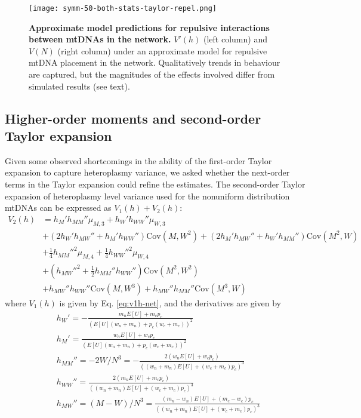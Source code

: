 \documentclass{article}
\begin{document}
\begin{appendices}
{\begin{figure}
\centering
\texttt{[image: symm-50-both-stats-taylor-repel.png]}
\caption{\textbf{Approximate model predictions for repulsive interactions between mtDNAs in the network.} $V'(h)$ (left column) and $V(N)$ (right column) under an approximate model for repulsive mtDNA placement in the network.  Qualitatively trends in behaviour are captured, but the magnitudes of the effects involved differ from simulated results (see text).}\label{fig:app-sim-model-compare-repel}
\end{figure}

\subsection{Higher-order moments and second-order Taylor expansion}\label{app:v2h-gen-moments}
Given some observed shortcomings in the ability of the first-order Taylor expansion to capture heteroplasmy variance, we asked whether the next-order terms in the Taylor expansion could refine the estimates. The second-order Taylor expansion of heteroplasmy level variance used for the nonuniform distribution mtDNAs can be expressed as $V_1(h)+V_2(h)$:
\begin{equation}\label{eq:app-v2h-net}
    \begin{split}
        V_2(h) & =  h_M'h_{MM}''\mu_{M,3} + h_W'h_{WW}''\mu_{W,3}\\
       & + (2h_W'h_{MW}''+h_M'h_{WW}'')\mathrm{Cov}(M,W^2) + (2h_M'h_{MW}''+h_W'h_{MM}'')\mathrm{Cov}(M^2,W)\\
       & + \frac{1}{4}h_{MM}''^2\mu_{M,4}
         +\frac{1}{4}h_{WW}''^2\mu_{W,4}\\
       & + (h_{MW}''^2+\frac{1}{2}h_{MM}''h_{WW}'')\mathrm{Cov}(M^2,W^2)\\
       & + h_{MW}''h_{WW}''\mathrm{Cov}(M,W^3)+h_{MW}''h_{MM}''\mathrm{Cov}(M^3,W)
    \end{split}
\end{equation}
where $V_1(h)$ is given by Eq. \ref{eq:v1h-net}, and the derivatives are given by
\begin{equation*}
    \begin{split}
        & h_W' =-\frac{m_nE[U]+m_cp_c}{(E[U](w_n+m_n)+p_c(w_c+m_c))^2}\\
        & h_M' = \frac{w_nE[U]+w_cp_c}{(E[U](w_n+m_n)+p_c(w_c+m_c))^2}\\
        & h_{MM}'' = -2W/N^3=-\frac{2(w_nE[U]+w_cp_c)}{((w_n+m_n)E[U]+(w_c+m_c)p_c)^3}\\
        & h_{WW}'' = \frac{2(m_nE[U]+m_cp_c)}{((w_n+m_n)E[U]+(w_c+m_c)p_c)^3}\\
        & h_{MW}'' = (M-W)/N^3=\frac{(m_n-w_n)E[U]+(m_c-w_c)p_c}{((w_n+m_n)E[U]+(w_c+m_c)p_c)^3}
    \end{split}
\end{equation*}

}
\end{appendices}
\end{document}

